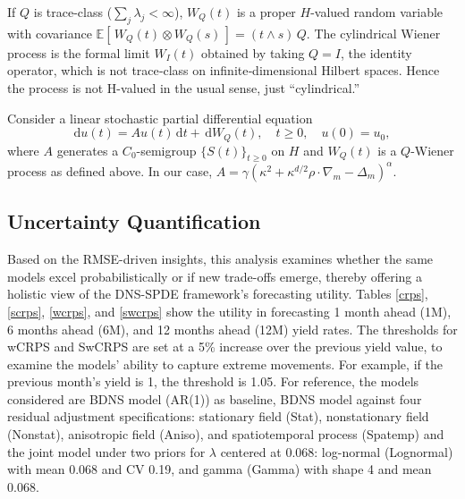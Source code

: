 \documentclass[
  12pt]{article}
\begin{document}
If $Q$ is trace-class ($\sum_j \lambda_j < \infty$), $W_Q(t)$ is a proper $H$-valued random variable with covariance $ \mathbb{E}[\, W_Q(t) \otimes W_Q(s) \,] = (t \wedge s)\, Q.$
The cylindrical Wiener process is the formal limit $W_I(t)$ obtained by taking $Q = I$, the identity operator, which is not trace‐class on infinite‐dimensional Hilbert spaces. Hence the process is not H-valued in the usual sense, just “cylindrical.”

Consider a linear stochastic partial differential equation
\[
    \mathrm{d}u(t) = A u(t)\, \mathrm{d}t + \, \mathrm{d}W_Q(t), 
    \quad t \ge 0, \quad u(0) = u_0,
\]
where $A$ generates a $C_0$-semigroup $\{S(t)\}_{t\ge 0}$ on $H$ and $W_Q(t)$ is a $Q$-Wiener process as defined above.  In our case, $A = \gamma (\kappa^2 + \kappa^{d/2} \rho \cdot \nabla_m - \Delta_m)^{\alpha}.$

\subsection{Uncertainty Quantification} \label{uncertainty}
Based on the RMSE-driven insights, this analysis examines whether the same models excel probabilistically or if new trade-offs emerge, thereby offering a holistic view of the DNS-SPDE framework’s forecasting utility. Tables \ref{crps}, \ref{scrps}, \ref{wcrps}, and \ref{swcrps} show the utility in forecasting 1 month ahead (1M), 6 months ahead (6M), and 12 months ahead (12M) yield rates. The thresholds for wCRPS and SwCRPS are set at a 5\% increase over the previous yield value, to examine the models’ ability to capture extreme movements. For example, if the previous month’s yield is 1, the threshold is 1.05. For reference, the models considered are BDNS model (AR(1)) as baseline, BDNS model against four residual adjustment specifications: stationary field (Stat), nonstationary field (Nonstat), anisotropic field (Aniso), and spatiotemporal process (Spatemp) and the joint model under two priors for $\lambda$ centered at 0.068: log-normal (Lognormal) with mean 0.068 and CV 0.19, and gamma (Gamma) with shape 4 and mean 0.068.
\end{document}
